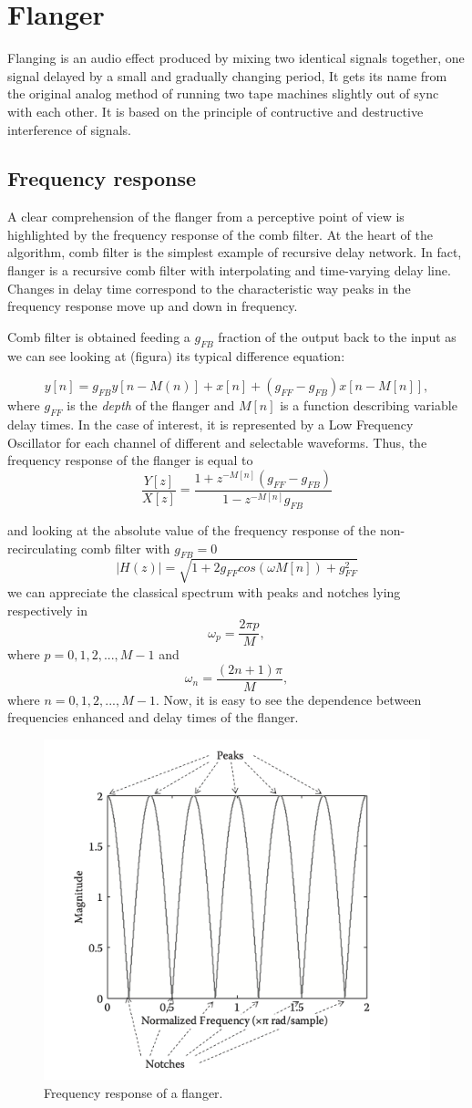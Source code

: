 \section{Flanger}

Flanging is an audio effect produced by mixing two identical signals together, one signal delayed by a small and gradually changing period, It gets its name from the original analog method of running two tape machines slightly out of sync with each other. It is based on the principle of contructive and destructive interference of signals.
\subsection{Frequency response}\label{sec:combfilt}

A clear comprehension of the flanger from a perceptive point of view  is highlighted by the frequency response of the comb filter. 
At the heart of the algorithm, comb filter is the simplest example of recursive delay network.
In fact, flanger is a recursive comb filter with interpolating and time-varying delay line. Changes in delay time correspond to the characteristic way peaks in the frequency response move up and down in frequency\cite{puckette2006theory}.

Comb filter is obtained feeding a $g_{FB}$ fraction of the output back to the input as we can see looking at (figura) its typical difference equation:

\[
y[n] = g_{FB} y[n - M(n)] + x[n] + (g_{FF} - g_{FB}) x[n - M[n]],
\]
where $g_{FF}$ is the \textit{depth} of the flanger and $M[n]$ is a function describing variable delay times. In the case of interest, it is represented by a Low Frequency Oscillator for each channel of different and selectable waveforms. Thus, the frequency response of the flanger is equal to 
\[
\frac{Y[z]}{X[z]} = \frac{1 + z^{-M[n]} (g_{FF} - g_{FB})} {1 - z^{-M[n]}  g_{FB} }
\]

and looking at the absolute value of the frequency response of the non-recirculating comb filter with $g_{FB} = 0$ 
\[
|H(z)| = \sqrt{ 1 + 2g_{FF} cos(\omega M[n]) + g_{FF}^2}
\]
we can appreciate the classical spectrum with peaks and notches lying respectively in 
\[
\omega_p = \frac{2 \pi p}{M},
\]
where $p = 0, 1, 2, ..., M-1$ and 
\[
\omega_n = \frac{(2n+1) \pi}{M},
\]
where $n = 0, 1, 2, ..., M-1$. Now, it is easy to see the dependence between frequencies enhanced and delay times of the flanger. 
\begin{figure}
	\centering
	\includegraphics[width=0.5\linewidth]{assets/comb.png}
	\caption{Frequency response of a flanger.}
	\label{fig:comb}
\end{figure}

